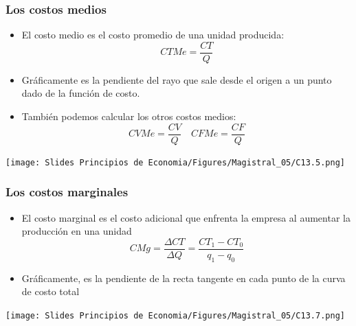 \documentclass{beamer}
\begin{document}
\begin{frame}
\frametitle{Los costos medios}
    \begin{minipage}{0.45\textwidth}
            \begin{itemize}
            \item El costo medio es el costo promedio de una unidad producida:
                \[ CTMe = \frac{CT}{Q} \]
            \item Gráficamente es la pendiente del rayo que sale desde el origen a un punto dado de la función de costo. 
            \item También podemos calcular los otros costos medios:
            \[
            CVMe = \frac{CV}{Q} \quad CFMe = \frac{CF}{Q}
            \]
            \end{itemize}
    \end{minipage}
    \hfill
    \begin{minipage}{0.4\textwidth}
    \texttt{[image: Slides Principios de Economia/Figures/Magistral\_05/C13.5.png]}
    \end{minipage}
 \end{frame}

 
\begin{frame}
\frametitle{Los costos marginales}
    \begin{minipage}{0.5\textwidth}
    \begin{itemize}
    \item El costo marginal es el costo adicional que enfrenta la empresa al aumentar la producción en una unidad 
        \[ CMg = \frac{\Delta CT}{\Delta Q} = \frac{CT_1 - CT_0}{q_1 - q_0} \]
    \item Gráficamente, es la pendiente de la recta tangente en cada punto de la curva de costo total
    \end{itemize}
    \end{minipage}
    \hfill
    \begin{minipage}{0.4\textwidth}
    \texttt{[image: Slides Principios de Economia/Figures/Magistral\_05/C13.7.png]}
    \end{minipage}
\end{frame}
\end{document}
